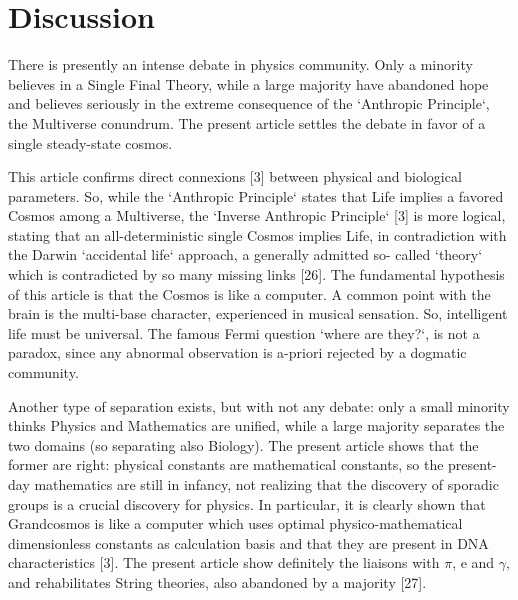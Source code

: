 \documentclass[twoside,draft]{article}
\begin{document}
\begin{sloppypar}
{\section {Discussion}

There is presently an intense debate in physics community. Only a minority believes in a Single
Final Theory, while a large majority have abandoned hope and believes seriously in the extreme
consequence of the `Anthropic Principle`, the Multiverse conundrum. The present article settles the
debate in favor of a single steady-state cosmos.

This article confirms direct connexions [3] between physical and biological parameters. So,
while the `Anthropic Principle` states that Life implies a favored Cosmos among a Multiverse, the
`Inverse Anthropic Principle` [3] is more logical, stating that an all-deterministic single Cosmos
implies Life, in contradiction with the Darwin `accidental life` approach, a generally admitted so-
called `theory` which is contradicted by so many missing links [26]. The fundamental hypothesis of
this article is that the Cosmos is like a computer. A common point with the brain is the multi-base
character, experienced in musical sensation. So, intelligent life must be universal. The famous Fermi
question `where are they?`, is not a paradox, since any abnormal observation is a-priori rejected by a
dogmatic community.

Another type of separation exists, but with not any debate: only a small minority thinks Physics
and Mathematics are unified, while a large majority separates the two domains (so separating also
Biology). The present article shows that the former are right: physical constants are mathematical
constants, so the present-day mathematics are still in infancy, not realizing that the discovery of
sporadic groups is a crucial discovery for physics. In particular, it is clearly shown that
Grandcosmos is like a computer which uses optimal physico-mathematical dimensionless constants as
calculation basis and that they are present in DNA characteristics [3]. The present article show
definitely the liaisons with $\pi$, e and $\gamma$, and rehabilitates String theories, also abandoned by a
majority [27].

}
\end{sloppypar}
\end{document}
